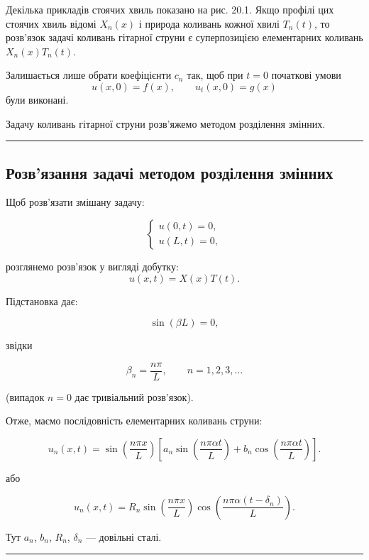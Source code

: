 \documentclass[
  ukrainian,
]{article}
\begin{document}
Декілька прикладів стоячих хвиль показано на рис. 20.1. Якщо профілі цих
стоячих хвиль відомі \(X_n(x)\) і природа коливань кожної хвилі
\(T_n(t)\), то розв'язок задачі коливань гітарної струни є суперпозицією
елементарних коливань \(X_n(x)T_n(t)\).

Залишається лише обрати коефіцієнти \(c_n\) так, щоб при \(t = 0\)
початкові умови \[
u(x,0)=f(x), \qquad u_t(x,0)=g(x)
\] були виконані.

Задачу коливань гітарної струни розв'яжемо методом розділення змінних.

\begin{center}\rule{0.5\linewidth}{0.5pt}\end{center}

\subsection{Розв'язання задачі методом розділення
змінних}\label{ux440ux43eux437ux432ux44fux437ux430ux43dux43dux44f-ux437ux430ux434ux430ux447ux456-ux43cux435ux442ux43eux434ux43eux43c-ux440ux43eux437ux434ux456ux43bux435ux43dux43dux44f-ux437ux43cux456ux43dux43dux438ux445}

Щоб розв'язати змішану задачу:

\[
\begin{cases}
u(0,t)=0,\\
u(L,t)=0,
\end{cases}
\]

розглянемо розв'язок у вигляді добутку: \[
u(x,t)=X(x)T(t).
\]

Підстановка дає:

\[
\sin(\beta L)=0,
\]

звідки

\[
\beta_n = \frac{n\pi}{L}, \qquad n=1,2,3,\ldots
\]

(випадок \(n=0\) дає тривіальний розв'язок).

Отже, маємо послідовність елементарних коливань струни:

\[
u_n(x,t)=\sin\!\left(\frac{n\pi x}{L}\right)
\left[a_n \sin\!\left(\frac{n\pi \alpha t}{L}\right)
+ b_n \cos\!\left(\frac{n\pi \alpha t}{L}\right)\right].
\]

або

\[
u_n(x,t)=R_n \sin\!\left(\frac{n\pi x}{L}\right)
\cos\!\left(\frac{n\pi \alpha (t-\delta_n)}{L}\right).
\]

Тут \(a_n\), \(b_n\), \(R_n\), \(\delta_n\) --- довільні сталі.

\begin{center}\rule{0.5\linewidth}{0.5pt}\end{center}
\end{document}
